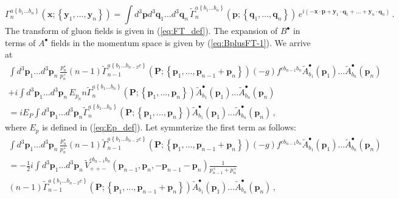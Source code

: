 \documentclass[english,american]{article}
\begin{document}
\begin{equation}
\Gamma_{n}^{a\left\{ b_{1}\dots b_{n}\right\} }\left(\mathbf{x};\left\{ \mathbf{y}_{1},\dots,\mathbf{y}_{n}\right\} \right)=\int d^{3}\mathbf{p}d^{3}\mathbf{q}_{1}\dots d^{3}\mathbf{q}_{n}\,\tilde{\Gamma}_{n}^{a\left\{ b_{1}\dots b_{n}\right\} }\left(\mathbf{p};\left\{ \mathbf{q}_{1},\dots,\mathbf{q}_{n}\right\} \right)\, e^{i\left(-\mathbf{x}\cdot\mathbf{p}+\mathbf{y}_{1}\cdot\mathbf{q}_{1}+\dots+\mathbf{y}_{n}\cdot\mathbf{q}_{n}\right)}\,.\label{eq:Gamma_mom}
\end{equation}
The transform of gluon fields is given in (\ref{eq:FT_def}). The
expansion of $B^{\bullet}$  in terms of $A^{\bullet}$ fields in the momentum space is given by (\ref{eq:BplusFT-1}).
We arrive at
\begin{multline}
\int d^{3}\mathbf{p}_{1}\dots d^{3}\mathbf{p}_{n}\,\frac{p_{n}^{\star}}{p_{n}^{+}}\left(n-1\right)\tilde{\Gamma}_{n-1}^{a\left\{ b_{1}\dots b_{n-2}c\right\} }\left(\mathbf{P};\left\{ \mathbf{p}_{1},\dots,\mathbf{p}_{n-1}+\mathbf{p}_{n}\right\} \right)\left(-g\right)f^{cb_{n-1}b_{n}}\tilde{A}_{b_{1}}^{\bullet}\left(\mathbf{p}_{1}\right)\dots\tilde{A}_{b_{n}}^{\bullet}\left(\mathbf{p}_{n}\right)\\
+i\int d^{3}\mathbf{p}_{1}\dots d^{3}\mathbf{p}_{n}\, E_{p_{n}}n\tilde{\Gamma}_{n}^{a\left\{ b_{1}\dots b_{n}\right\} }\left(\mathbf{P};\left\{ \mathbf{p}_{1},\dots,\mathbf{p}_{n}\right\} \right)\tilde{A}_{b_{1}}^{\bullet}\left(\mathbf{p}_{1}\right)\dots\tilde{A}_{b_{n}}^{\bullet}\left(\mathbf{p}_{n}\right)\\
=iE_{P}\int d^{3}\mathbf{p}_{1}\dots d^{3}\mathbf{p}_{n}\tilde{\Gamma}_{n}^{a\left\{ b_{1}\dots b_{n}\right\} }\left(\mathbf{P};\left\{ \mathbf{p}_{1},\dots,\mathbf{p}_{n}\right\} \right)\tilde{A}_{b_{1}}^{\bullet}\left(\mathbf{p}_{1}\right)\dots\tilde{A}_{b_{n}}^{\bullet}\left(\mathbf{p}_{n}\right)\,,\label{eq:MasterEq_mom2}
\end{multline}
where $E_{p}$ is defined in (\ref{eq:Ep_def}). Let symmterize the
first term as follows:
\begin{multline}
\int d^{3}\mathbf{p}_{1}\dots d^{3}\mathbf{p}_{n}\,\frac{p_{n}^{\star}}{p_{n}^{+}}\left(n-1\right)\tilde{\Gamma}_{n-1}^{a\left\{ b_{1}\dots b_{n-2}c\right\} }\left(\mathbf{P};\left\{ \mathbf{p}_{1},\dots,\mathbf{p}_{n-1}+\mathbf{p}_{n}\right\} \right)\left(-g\right)f^{cb_{n-1}b_{n}}\tilde{A}_{b_{1}}^{\bullet}\left(\mathbf{p}_{1}\right)\dots\tilde{A}_{b_{n}}^{\bullet}\left(\mathbf{p}_{n}\right)\\
=-\frac{1}{2}i\int d^{3}\mathbf{p}_{1}\dots d^{3}\mathbf{p}_{n}\,\tilde{V}_{++-}^{cb_{n-1}b_{n}}\left(\mathbf{p}_{n-1},\mathbf{p}_{n},-\mathbf{p}_{n-1}-\mathbf{p}_{n}\right)\frac{1}{p_{n-1}^{+}+p_{n}^{+}}\\
\left(n-1\right)\tilde{\Gamma}_{n-1}^{a\left\{ b_{1}\dots b_{n-2}c\right\} }\left(\mathbf{P};\left\{ \mathbf{p}_{1},\dots,\mathbf{p}_{n-1}+\mathbf{p}_{n}\right\} \right)\tilde{A}_{b_{1}}^{\bullet}\left(\mathbf{p}_{1}\right)\dots\tilde{A}_{b_{n}}^{\bullet}\left(\mathbf{p}_{n}\right)\,,
\end{multline}
\end{document}
